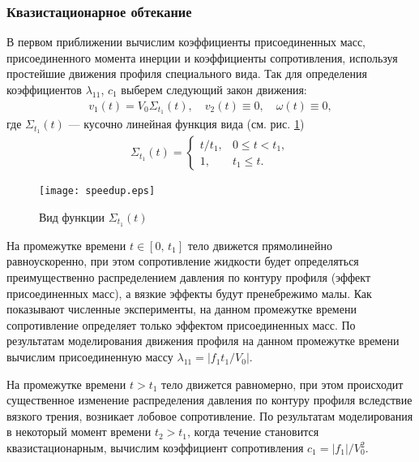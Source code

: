 \subsubsection*{Квазистационарное обтекание}

В первом приближении вычислим коэффициенты присоединенных масс, присоединенного момента инерции и коэффициенты сопротивления, используя простейшие движения профиля специального вида. Так для определения коэффициентов $\lambda_{11}$, $c_1$ выберем следующий закон движения:
\begin{gather}
	v_1(t) = V_0 \Sigma_{t_1}(t),\quad v_2(t) \equiv 0,\quad \omega(t) \equiv 0,
\end{gather}
где $\Sigma_{t_1}(t)$ --- кусочно линейная функция вида (см. рис. \ref{fig.sigma})
\begin{gather}
	\Sigma_{t_1}(t) = \begin{cases}
		t / t_1, & 0 \leqslant t < t_1,\\
		1, & t_1 \leqslant t.
	\end{cases}
\end{gather}

\begin{figure}[ht!]
	\centering
	\texttt{[image: speedup.eps]}
	\caption{Вид функции $\Sigma_{t_1}(t)$}\label{fig.sigma}
\end{figure}

На промежутке времени $t \in [0,\, t_1]$ тело движется прямолинейно равноускоренно, при этом сопротивление жидкости будет определяться преимущественно распределением давления по контуру профиля (эффект присоединенных масс), а вязкие эффекты будут пренебрежимо малы. Как показывают численные эксперименты, на данном промежутке времени сопротивление определяет только эффектом присоединенных масс. По результатам моделирования движения профиля на данном промежутке времени вычислим присоединенную массу $\lambda_{11} = |f_1 t_1 / V_0|$.

На промежутке времени $t > t_1$ тело движется равномерно, при этом происходит существенное изменение распределения давления по контуру профиля вследствие вязкого трения, возникает лобовое сопротивление. По результатам моделирования в некоторый момент времени $t_2 > t_1$, когда течение становится квазистационарным, вычислим коэффициент сопротивления $c_1 = |f_1| / V_0^2$.

